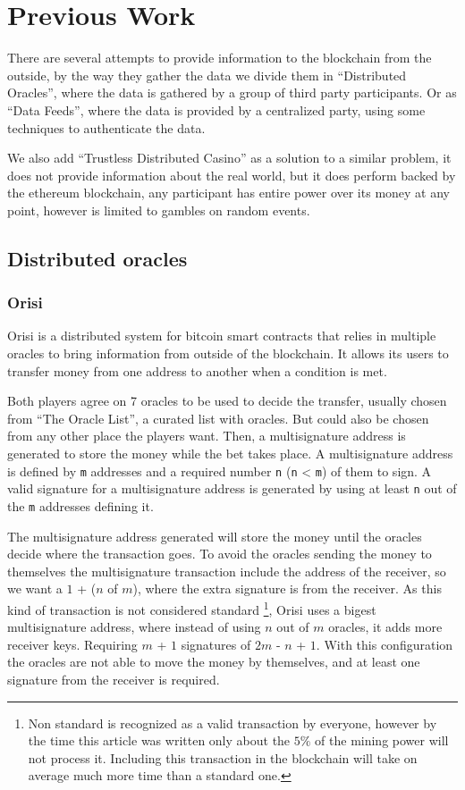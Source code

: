 \section{Previous Work}

There are several attempts to provide information to the blockchain from the
  outside, by the way they gather the data we divide them in
  ``Distributed Oracles'', where the data is gathered by a group of third party
  participants. Or as ``Data Feeds'', where the data is provided by a
  centralized party, using some techniques to authenticate the data.

We also add ``Trustless Distributed Casino'' as a solution to a similar problem,
  it does not provide information about the real world, but it does perform
  backed by the ethereum blockchain, any participant has entire power over its
  money at any point, however is limited to gambles on random events.

\subsection{Distributed oracles}
\subsubsection{Orisi}
Orisi\cite{orisiwhitepaper} is a distributed system for bitcoin smart
  contracts that relies in multiple oracles to bring information from outside
  of the blockchain.
It allows its users to transfer money from one address to another when a
  condition is met.

Both players agree on 7 oracles to be used to decide the transfer, usually
  chosen from ``The Oracle List'', a curated list with oracles. But could also
  be chosen from any other place the players want. Then, a multisignature
  address is generated to store the money while the bet takes place.
A multisignature address is defined by \texttt{m} addresses and a required
  number \texttt{n} (\texttt{n} < \texttt{m}) of them to sign. A valid
  signature for a multisignature address is generated by using at least
  \texttt{n} out of the \texttt{m} addresses defining it.

The multisignature address generated will store the money until the oracles
  decide where the transaction goes. To avoid the oracles sending the money
  to themselves the multisignature transaction include the address of the
  receiver, so we want a $1$ + ($n$ of $m$), where the extra signature is
  from the receiver. As this kind of transaction is not considered standard
  \footnote{Non standard is recognized as a valid transaction by everyone,
  however by the time this article was written only about the $5\%$ of the
  mining power will not process it. Including this transaction in the
  blockchain will take on average much more time than a standard one.},
  Orisi uses a bigest multisignature address, where instead of using
  $n$ out of $m$ oracles, it adds more receiver keys. Requiring $m$ + $1$
  signatures of $2m$ - $n$ + $1$. With this configuration the oracles are
  not able to move the money by themselves, and at least one signature
  from the receiver is required.


